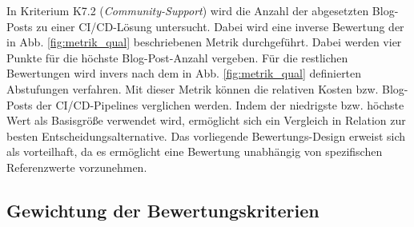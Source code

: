 \vspace*{-15mm}
In Kriterium K7.2 (\textit{Community-Support}) wird die Anzahl der abgesetzten Blog-Posts zu einer CI/CD-Lösung untersucht. Dabei wird eine inverse Bewertung der in Abb. \ref*{fig:metrik_qual} beschriebenen Metrik durchgeführt. Dabei werden vier Punkte für die höchste Blog-Post-Anzahl vergeben. Für die restlichen Bewertungen wird invers nach dem in Abb. \ref*{fig:metrik_qual} definierten Abstufungen verfahren. Mit dieser Metrik können die relativen Kosten bzw. Blog-Posts der CI/CD-Pipelines verglichen werden. Indem der niedrigste bzw. höchste Wert als Basisgröße verwendet wird, ermöglicht sich ein Vergleich in Relation zur besten Entscheidungsalternative. Das vorliegende Bewertungs-Design erweist sich als vorteilhaft, da es ermöglicht eine Bewertung unabhängig von spezifischen Referenzwerte vorzunehmen.

\subsection{Gewichtung der Bewertungskriterien}

